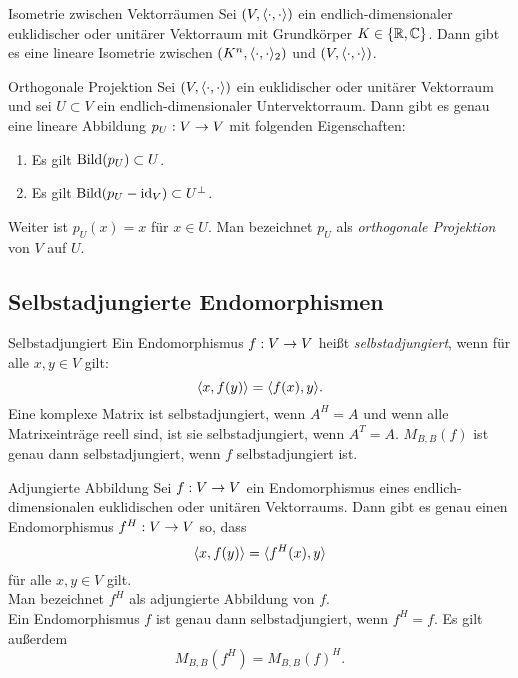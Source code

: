 \documentclass[main.tex]{subfiles}
\begin{document}
\begin{karte}{Isometrie zwischen Vektorräumen}
    Sei \( (V, \langle \cdot, \cdot \rangle) \) ein 
    endlich-dimensionaler euklidischer oder 
    unitärer Vektorraum mit Grundkörper 
    \( K\in \{\mathbb{R}, \mathbb{C}\} \). Dann gibt es eine lineare 
    Isometrie zwischen \( (K^n, \langle \cdot, \cdot \rangle_2) \)
    und \( (V, \langle \cdot, \cdot \rangle) \).
\end{karte}

\begin{karte}{Orthogonale Projektion}
    Sei \( (V,\langle \cdot, \cdot \rangle) \) ein 
    euklidischer oder unitärer Vektorraum und 
    sei \( U \subset V \) ein endlich-dimensionaler 
    Untervektorraum. Dann gibt es genau eine lineare 
    Abbildung \( p_U : V \rightarrow V \) mit folgenden 
    Eigenschaften:
    \begin{enumerate}
        \item Es gilt \(\operatorname{Bild}(p_U) \subset U\).
        \item Es gilt \( \operatorname{Bild}(p_U - \operatorname{id}_V)\subset U^\bot \).
    \end{enumerate}
    Weiter ist \( p_U(x) = x \) für \( x\in U \). Man 
    bezeichnet \( p_U \) als \textit{orthogonale Projektion} 
    von \(V\) auf \(U\).
\end{karte}

\subsection*{Selbstadjungierte Endomorphismen}

\begin{karte}{Selbstadjungiert}
    Ein Endomorphismus \( f : V \rightarrow V \) heißt 
    \textit{selbstadjungiert}, wenn für alle 
    \( x,y\in V \) gilt:
    \[ \langle x, f(y) \rangle = \langle f(x), y \rangle. \]
    Eine komplexe Matrix ist selbstadjungiert, wenn 
    \( A^H = A \) und wenn alle Matrixeinträge reell 
    sind, ist sie selbstadjungiert, wenn \(A^T = A\).
    \( M_{B,B}(f) \) ist genau dann selbstadjungiert, 
    wenn \(f\) selbstadjungiert ist.
\end{karte}

\begin{karte}{Adjungierte Abbildung}
    Sei \( f : V \rightarrow V \) ein Endomorphismus 
    eines endlich-dimensionalen euklidischen oder unitären 
    Vektorraums. Dann gibt es genau einen Endomorphismus 
    \( f^H : V \rightarrow V \) so, dass 
    \[ \langle x, f(y) \rangle = \langle f^H(x), y \rangle \] 
    für alle \( x,y\in V \) gilt. \\
    Man bezeichnet \(f^H\) als adjungierte Abbildung 
    von \(f\).\\
    Ein Endomorphismus \(f\) ist genau dann selbstadjungiert, 
    wenn \(f^H = f\).
    Es gilt außerdem 
    \[ M_{B,B}(f^H) = M_{B, B}(f)^H. \]
\end{karte}
\end{document}
